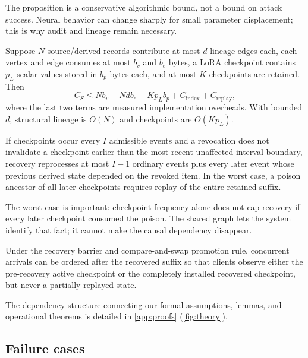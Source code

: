 The proposition is a conservative algorithmic bound, not a bound on attack success. Neural behavior can change sharply for small parameter displacement; this is why audit and lineage remain necessary.

\begin{proposition}
\label{prop:storage}
Suppose $N$ source/derived records contribute at most $d$ lineage edges each, each vertex and edge consumes at most $b_v$ and $b_e$ bytes, a LoRA checkpoint contains $p_L$ scalar values stored in $b_p$ bytes each, and at most $K$ checkpoints are retained. Then
\begin{equation}
C_S\le Nb_v+Ndb_e+Kp_Lb_p+C_{\mathrm{index}}+C_{\mathrm{replay}},
\label{eq:storage-bound}
\end{equation}
where the last two terms are measured implementation overheads. With bounded $d$, structural lineage is $O(N)$ and checkpoints are $O(Kp_L)$.
\end{proposition}

\begin{proposition}
\label{prop:replay}
If checkpoints occur every $I$ admissible events and a revocation does not invalidate a checkpoint earlier than the most recent unaffected interval boundary, recovery reprocesses at most $I-1$ ordinary events plus every later event whose previous derived state depended on the revoked item. In the worst case, a poison ancestor of all later checkpoints requires replay of the entire retained suffix.
\end{proposition}

The worst case is important: checkpoint frequency alone does not cap recovery if every later checkpoint consumed the poison. The shared graph lets the system identify that fact; it cannot make the causal dependency disappear.

\begin{theorem}
\label{thm:linearizable}
Under the recovery barrier and compare-and-swap promotion rule, concurrent arrivals can be ordered after the recovered suffix so that clients observe either the pre-recovery active checkpoint or the completely installed recovered checkpoint, but never a partially replayed state.
\end{theorem}

The dependency structure connecting our formal assumptions, lemmas, and operational theorems is detailed in \cref{app:proofs} (\cref{fig:theory}).

\subsection{Failure cases}

